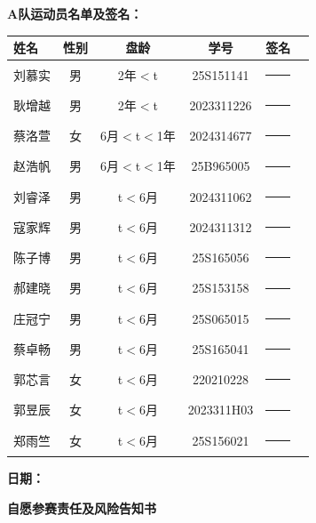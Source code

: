 \documentclass{article}
\begin{document}
\vspace{0.5cm} %

\noindent \textbf{A队运动员名单及签名：} \\
\begin{center}
\small %
\renewcommand{\arraystretch}{1.8} %
\begin{tabular}{lccccl} %
    \toprule %
    \textbf{姓名} & \textbf{性别} & \textbf{盘龄} & \textbf{学号} & \textbf{签名} \\[3pt] %
    \midrule %
    刘慕实 & 男 & 2年$<$t & 25S151141 & \rule{3cm}{0.4pt} \\
    耿增越 & 男 & 2年$<$t & 2023311226 & \rule{3cm}{0.4pt} \\
    蔡洛萱 & 女 & 6月$<$t$<$1年 & 2024314677 & \rule{3cm}{0.4pt} \\
    赵浩帆 & 男 & 6月$<$t$<$1年 & 25B965005 & \rule{3cm}{0.4pt} \\
    刘睿泽 & 男 & t$<$6月 & 2024311062 & \rule{3cm}{0.4pt} \\
    寇家辉 & 男 & t$<$6月 & 2024311312 & \rule{3cm}{0.4pt} \\
    陈子博 & 男 & t$<$6月 & 25S165056 & \rule{3cm}{0.4pt} \\
    郝建晓 & 男 & t$<$6月 & 25S153158 & \rule{3cm}{0.4pt} \\
    庄冠宁 & 男 & t$<$6月 & 25S065015 & \rule{3cm}{0.4pt} \\
    蔡卓畅 & 男 & t$<$6月 & 25S165041 & \rule{3cm}{0.4pt} \\
    郭芯言 & 女 & t$<$6月 & 220210228 & \rule{3cm}{0.4pt} \\
    郭昱辰 & 女 & t$<$6月 & 2023311H03 & \rule{3cm}{0.4pt} \\
    郑雨竺 & 女 & t$<$6月 & 25S156021 & \rule{3cm}{0.4pt} \\
    \bottomrule %
\end{tabular}
\end{center}

\vspace{0.5cm} %
\noindent \textbf{日期：}

\newpage

\begin{center}
    \vspace*{-1.5cm} %
    {\fontsize{18pt}{28pt}\selectfont\textbf{自愿参赛责任及风险告知书}} %
    \vspace{0.5cm} %
\end{center}
\end{document}
